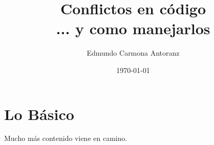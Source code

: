\documentclass{report}
\title{Conflictos en código \\
	\large ... y como manejarlos}
\author{Edmundo Carmona Antoranz}
\date{\today}
\begin{document}
\begin{titlepage}
\maketitle
\end{titlepage}


\clearpage


\clearpage


\clearpage


\clearpage


\clearpage


\clearpage

\chapter{Lo Básico}

\clearpage


\clearpage


\clearpage


\clearpage


\clearpage


\clearpage




Mucho más contenido viene en camino.


\end{document}
